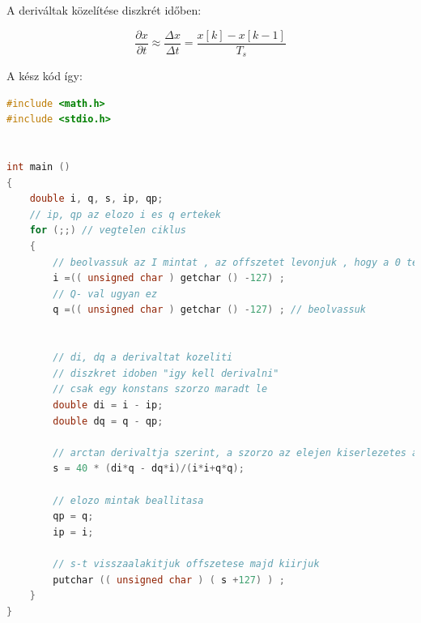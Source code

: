 \documentclass[12pt,a4paper]{article}
\begin{document}
A deriváltak közelítése diszkrét időben:

\begin{equation}
\frac{\partial x}{\partial t} \approx \frac{\Delta x}{\Delta t} = \frac{x[k]-x[k-1]}{T_s}
\end{equation}

\newpage
A kész kód így:

\begin{lstlisting}[frame=single,language=c,caption=FM demodulátor C-ben]
#include <math.h>
#include <stdio.h>


int main ()
{
    double i, q, s, ip, qp;
    // ip, qp az elozo i es q ertekek
    for (;;) // vegtelen ciklus
    {
        // beolvassuk az I mintat , az offszetet levonjuk , hogy a 0 tenyleg 0 legyen
        i =(( unsigned char ) getchar () -127) ;
        // Q- val ugyan ez
        q =(( unsigned char ) getchar () -127) ; // beolvassuk


        // di, dq a derivaltat kozeliti
        // diszkret idoben "igy kell derivalni"
        // csak egy konstans szorzo maradt le
        double di = i - ip;
        double dq = q - qp;

        // arctan derivaltja szerint, a szorzo az elejen kiserlezetes alapjan lett ennyi
        s = 40 * (di*q - dq*i)/(i*i+q*q);

        // elozo mintak beallitasa
        qp = q;
        ip = i;

        // s-t visszaalakitjuk offszetese majd kiirjuk
        putchar (( unsigned char ) ( s +127) ) ;
    }
}
\end{lstlisting}
\end{document}
